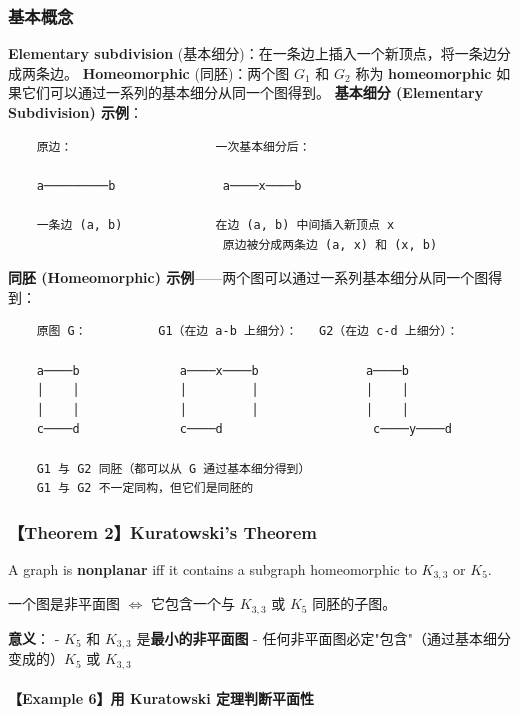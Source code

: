 \documentclass[10pt,a4paper,openany]{ctexbook}
\theoremstyle{definition}
\theoremstyle{remark}
\renewenvironment{quote}
  {\list{}{\leftmargin=1em\rightmargin=0pt\topsep=0.5pt\partopsep=0pt}\item[]}
  {\endlist}
\begin{document}
\subsubsection{基本概念}

\textbf{Elementary subdivision} (基本细分)：在一条边上插入一个新顶点，将一条边分成两条边。
\textbf{Homeomorphic} (同胚)：两个图 $G_1$ 和 $G_2$ 称为 \textbf{homeomorphic} 如果它们可以通过一系列的基本细分从同一个图得到。
\textbf{基本细分 (Elementary Subdivision) 示例}：
{\footnotesize\begin{verbatim}
    原边：                    一次基本细分后：
    
    a─────────b               a────x────b
    
    一条边 (a, b)             在边 (a, b) 中间插入新顶点 x
                              原边被分成两条边 (a, x) 和 (x, b)
\end{verbatim}}

\textbf{同胚 (Homeomorphic) 示例}——两个图可以通过一系列基本细分从同一个图得到：
{\footnotesize\begin{verbatim}
    原图 G：          G1（在边 a-b 上细分）：   G2（在边 c-d 上细分）：
    
    a────b              a────x────b               a────b
    │    │              │         │               │    │
    │    │              │         │               │    │
    c────d              c────d                     c────y────d
    
    G1 与 G2 同胚（都可以从 G 通过基本细分得到）
    G1 与 G2 不一定同构，但它们是同胚的
\end{verbatim}}

\subsubsection{【Theorem 2】Kuratowski's Theorem}

\begin{quote}
A graph is \textbf{nonplanar} iff it contains a subgraph homeomorphic to $K_{3,3}$ or $K_5$.

一个图是非平面图 $\iff$ 它包含一个与 $K_{3,3}$ 或 $K_5$ 同胚的子图。

\textbf{意义}：
- $K_5$ 和 $K_{3,3}$ 是\textbf{最小的非平面图}
- 任何非平面图必定"包含"（通过基本细分变成的）$K_5$ 或 $K_{3,3}$

\end{quote}

\paragraph{【Example 6】用 Kuratowski 定理判断平面性}
\end{document}
